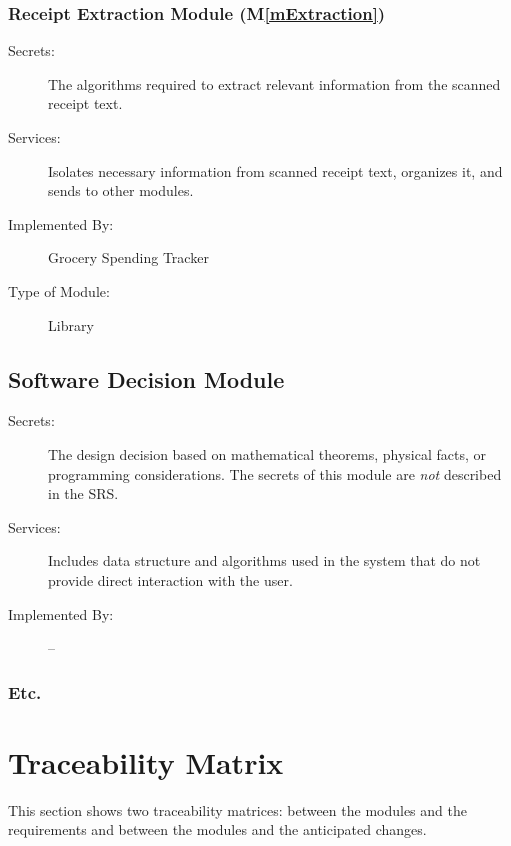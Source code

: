 \documentclass[12pt, titlepage]{article}
\newcommand{\mref}[1]{M\ref{#1}}
\begin{document}
\subsubsection{Receipt Extraction Module (\mref{mExtraction})}

\begin{description}
\item[Secrets:] The algorithms required to extract relevant information from the scanned receipt text.
\item[Services:] Isolates necessary information from scanned receipt text, organizes it, and sends to other
modules.
\item[Implemented By:] Grocery Spending Tracker
\item[Type of Module:] Library
\end{description}


\subsection{Software Decision Module}

\begin{description}
\item[Secrets:] The design decision based on mathematical theorems, physical
  facts, or programming considerations. The secrets of this module are
  \emph{not} described in the SRS.
\item[Services:] Includes data structure and algorithms used in the system that
  do not provide direct interaction with the user. 
\item[Implemented By:] --
\end{description}

\subsubsection{Etc.}

\section{Traceability Matrix} \label{SecTM}

This section shows two traceability matrices: between the modules and the
requirements and between the modules and the anticipated changes.
\end{document}
